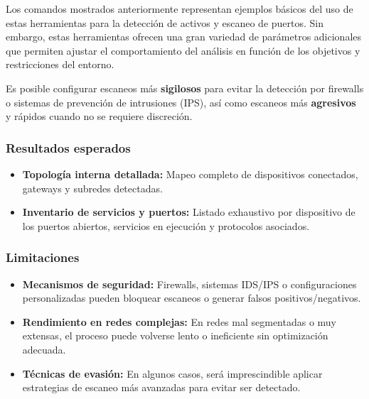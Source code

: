 \documentclass[a4paper, 11pt]{article}
\begin{document}
Los comandos mostrados anteriormente representan ejemplos básicos del uso de estas herramientas para la detección de activos y escaneo de puertos. Sin embargo, estas herramientas ofrecen una gran variedad de parámetros adicionales que permiten ajustar el comportamiento del análisis en función de los objetivos y restricciones del entorno.

Es posible configurar escaneos más \textbf{sigilosos} para evitar la detección por firewalls o sistemas de prevención de intrusiones (IPS), así como escaneos más \textbf{agresivos} y rápidos cuando no se requiere discreción.

\subsubsection*{Resultados esperados}
\begin{itemize}

    \item \textbf{Topología interna detallada:} Mapeo completo de dispositivos conectados, gateways y subredes detectadas. 
    
    \item \textbf{Inventario de servicios y puertos:} Listado exhaustivo por dispositivo de los puertos abiertos, servicios en ejecución y protocolos asociados.
\end{itemize}

\subsubsection*{Limitaciones}

\begin{itemize}
   
    \item \textbf{Mecanismos de seguridad:} Firewalls, sistemas IDS/IPS o configuraciones personalizadas pueden bloquear escaneos o generar falsos positivos/negativos.
    
    \item \textbf{Rendimiento en redes complejas:} En redes mal segmentadas o muy extensas, el proceso puede volverse lento o ineficiente sin optimización adecuada.
    
    \item \textbf{Técnicas de evasión:} En algunos casos, será imprescindible aplicar estrategias de escaneo más avanzadas para evitar ser detectado.
\end{itemize}
\end{document}
